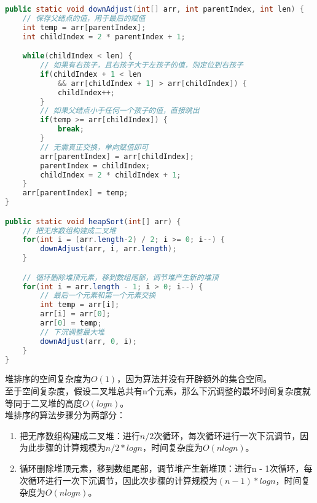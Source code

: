 \vspace{0.5cm}


\begin{lstlisting}[language=Java]
public static void downAdjust(int[] arr, int parentIndex, int len) {
    // 保存父结点的值，用于最后的赋值
    int temp = arr[parentIndex];
    int childIndex = 2 * parentIndex + 1;

    while(childIndex < len) {
        // 如果有右孩子，且右孩子大于左孩子的值，则定位到右孩子
        if(childIndex + 1 < len 
            && arr[childIndex + 1] > arr[childIndex]) {
            childIndex++;
        }
        // 如果父结点小于任何一个孩子的值，直接跳出
        if(temp >= arr[childIndex]) {
            break;
        }
        // 无需真正交换，单向赋值即可
        arr[parentIndex] = arr[childIndex];
        parentIndex = childIndex;
        childIndex = 2 * childIndex + 1;
    }
    arr[parentIndex] = temp;
}

public static void heapSort(int[] arr) {
    // 把无序数组构建成二叉堆
    for(int i = (arr.length-2) / 2; i >= 0; i--) {
        downAdjust(arr, i, arr.length);
    }

    // 循环删除堆顶元素，移到数组尾部，调节堆产生新的堆顶
    for(int i = arr.length - 1; i > 0; i--) {
        // 最后一个元素和第一个元素交换
        int temp = arr[i];
        arr[i] = arr[0];
        arr[0] = temp;
        // 下沉调整最大堆
        downAdjust(arr, 0, i);
    }
}
\end{lstlisting}

堆排序的空间复杂度为$ O(1) $，因为算法并没有开辟额外的集合空间。\\

至于空间复杂度，假设二叉堆总共有n个元素，那么下沉调整的最坏时间复杂度就等同于二叉堆的高度$ O(logn) $。\\

堆排序的算法步骤分为两部分：

\begin{enumerate}
	\item 把无序数组构建成二叉堆：进行$ n / 2 $次循环，每次循环进行一次下沉调节，因为此步骤的计算规模为$ n/2 * logn $，时间复杂度为$ O(nlogn) $。

	\item 循环删除堆顶元素，移到数组尾部，调节堆产生新堆顶：进行n - 1次循环，每次循环进行一次下沉调节，因此次步骤的计算规模为$ (n-1) * logn $，时间复杂度为$ O(nlogn) $。
\end{enumerate}

